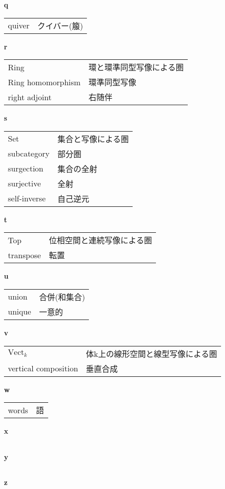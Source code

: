 \documentclass[dvipdfmx]{jsarticle}
\begin{document}
\textbf{q}

  \begin{tabular}{ll}
    quiver & クイバー(箙)
  \end{tabular}

\textbf{r}

  \begin{tabular}{ll}
    Ring & 環と環準同型写像による圏 \\
    Ring homomorphism & 環準同型写像 \\
    right adjoint & 右随伴 \\
  \end{tabular}

\textbf{s}

  \begin{tabular}{ll}
    Set & 集合と写像による圏 \\
    subcategory & 部分圏 \\
    surgection & 集合の全射 \\
    surjective & 全射 \\
    self-inverse & 自己逆元 \\
  \end{tabular}

\textbf{t}

  \begin{tabular}{ll}
    Top & 位相空間と連続写像による圏 \\
    transpose & 転置 \\
  \end{tabular}

\textbf{u}

  \begin{tabular}{ll}
    union & 合併(和集合) \\
    unique & 一意的 \\
  \end{tabular}

\textbf{v}

  \begin{tabular}{ll}
    $\mathrm{Vect}_k$ & 体k上の線形空間と線型写像による圏 \\
    vertical composition & 垂直合成 \\
  \end{tabular}

\textbf{w}

  \begin{tabular}{ll}
    words & 語 \\
  \end{tabular}

\textbf{x}

  \begin{tabular}{ll}
  \end{tabular}

\textbf{y}

  \begin{tabular}{ll}
  \end{tabular}

\textbf{z}

  \begin{tabular}{ll}
  \end{tabular}
\end{document}
